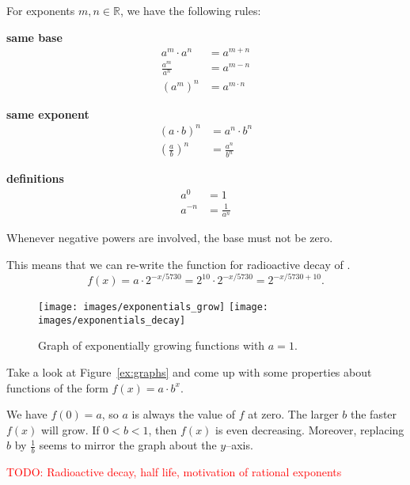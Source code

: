 \begin{tcolorbox}
	For exponents $m,n\in\mathbb R$, we have the following rules:
	\begin{multicols}{3}
		\centering
		\textbf{same base}\\
		\begin{align*}
			a^m\cdot a^n&=a^{m+n} \\[10pt]
			\frac{a^m}{a^n}&=a^{m-n} \\[10pt]
			\left(a^m\right)^n&=a^{m\cdot n}
		\end{align*}
		\vfill
		\columnbreak
		
		\textbf{same exponent}\\
		\begin{align*}
			\left(a\cdot b\right)^n&=a^n\cdot b^n \\[10pt]
			\left(\frac{a}{b}\right)^n&=\frac{a^n}{b^n}
		\end{align*}
		\vfill
		\columnbreak
		
		\textbf{definitions}\\
		\begin{align*}
			a^0&=1 \\[10pt]
			a^{-n}&=\frac{1}{a^n}
		\end{align*}
		\vfill
	\end{multicols}
	Whenever negative powers are involved, the base must not be zero.
\end{tcolorbox}
This means that we can re-write the function for radioactive decay of .
\begin{equation*}
	f\left(x\right)=a\cdot 2^{-x/5730}=2^{10}\cdot 2^{-x/5730}=2^{-x/5730+10}.
\end{equation*}
\begin{figure}[ht]
	\centering
	\texttt{[image: images/exponentials\_grow]}\hfill
	\texttt{[image: images/exponentials\_decay]}
	\caption{Graph of exponentially growing functions with $a=1$.}
	\label{fig:graphs}
\end{figure}
\begin{exercise} \label{ex:graphs}
	Take a look at Figure~\ref{ex:graphs} and come up with some properties about functions of the form $f\left(x\right)=a\cdot b^x$.
\end{exercise}
\begin{solution*}
	We have $f\left(0\right)=a$, so $a$ is always the value of $f$ at zero.
	The larger $b$ the faster $f\left(x\right)$ will grow.
	If $0<b<1$, then $f\left(x\right)$ is even decreasing.
	Moreover, replacing $b$ by $\frac{1}{b}$ seems to mirror the graph about the $y$--axis.
\end{solution*}
\textcolor{red}{TODO: Radioactive decay, half life, motivation of rational exponents}
